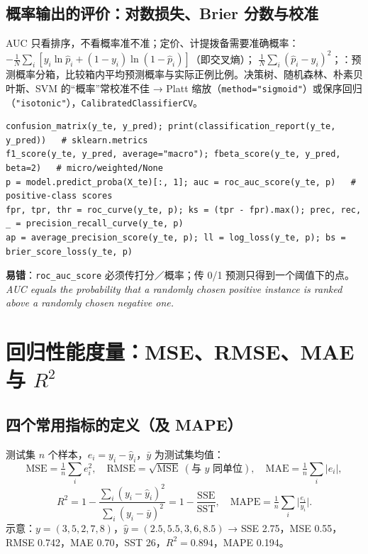 \subsection{概率输出的评价：对数损失、Brier 分数与校准}
AUC 只看排序，不看概率准不准；定价、计提拨备需要准确概率： $-\frac1N\sum_i[y_i\ln\hat p_i+(1-y_i)\ln(1-\hat p_i)]$（即交叉熵）； $\frac1N\sum_i(\hat p_i-y_i)^2$；：预测概率分箱，比较箱内平均预测概率与实际正例比例。决策树、随机森林、朴素贝叶斯、SVM 的“概率”常校准不佳 → Platt 缩放（\texttt{method="sigmoid"}）或保序回归（\texttt{"isotonic"}），\texttt{CalibratedClassifierCV}。
\begin{lstlisting}[basicstyle=\ttfamily\footnotesize]
confusion_matrix(y_te, y_pred); print(classification_report(y_te, y_pred))   # sklearn.metrics
f1_score(y_te, y_pred, average="macro"); fbeta_score(y_te, y_pred, beta=2)   # micro/weighted/None
p = model.predict_proba(X_te)[:, 1]; auc = roc_auc_score(y_te, p)   # positive-class scores
fpr, tpr, thr = roc_curve(y_te, p); ks = (tpr - fpr).max(); prec, rec, _ = precision_recall_curve(y_te, p)
ap = average_precision_score(y_te, p); ll = log_loss(y_te, p); bs = brier_score_loss(y_te, p)
\end{lstlisting}
\noindent\textbf{易错}：\texttt{roc\_auc\_score} 必须传打分／概率；传 0/1 预测只得到一个阈值下的点。\textit{AUC equals the probability that a randomly chosen positive instance is ranked above a randomly chosen negative one.}

\section{\texorpdfstring{回归性能度量：MSE、RMSE、MAE 与 $R^2$}{回归性能度量：MSE、RMSE、MAE 与 R2}}

\subsection{\texorpdfstring{四个常用指标的定义（及 MAPE）}{四个常用指标的定义（及 MAPE）}}
测试集 $n$ 个样本，$e_i=y_i-\hat y_i$，$\bar y$ 为测试集均值：
\[
\mathrm{MSE}=\tfrac1n\textstyle\sum_i e_i^2,\quad \mathrm{RMSE}=\sqrt{\mathrm{MSE}}\ (\text{与 }y\text{ 同单位}),\quad \mathrm{MAE}=\tfrac1n\sum_i|e_i|,\]\[R^2=1-\frac{\sum_i(y_i-\hat y_i)^2}{\sum_i(y_i-\bar y)^2}=1-\frac{\mathrm{SSE}}{\mathrm{SST}},\quad \mathrm{MAPE}=\tfrac1n\sum_i\big|\tfrac{e_i}{y_i}\big|.
\]
示意：$y=(3,5,2,7,8)$，$\hat y=(2.5,5.5,3,6,8.5)$ → SSE 2.75，MSE 0.55，RMSE 0.742，MAE 0.70，SST 26，$R^2=0.894$，MAPE 0.194。

